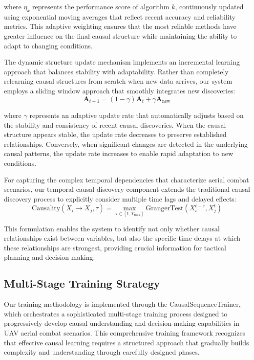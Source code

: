 \documentclass[12pt]{article}
\begin{document}
where $\eta_k$ represents the performance score of algorithm $k$, continuously updated using exponential moving averages that reflect recent accuracy and reliability metrics. This adaptive weighting ensures that the most reliable methods have greater influence on the final causal structure while maintaining the ability to adapt to changing conditions.

The dynamic structure update mechanism implements an incremental learning approach that balances stability with adaptability. Rather than completely relearning causal structures from scratch when new data arrives, our system employs a sliding window approach that smoothly integrates new discoveries:
\begin{equation}
\mathbf{A}_{t+1} = (1-\gamma) \mathbf{A}_t + \gamma \mathbf{A}_{\text{new}}
\end{equation}

where $\gamma$ represents an adaptive update rate that automatically adjusts based on the stability and consistency of recent causal discoveries. When the causal structure appears stable, the update rate decreases to preserve established relationships. Conversely, when significant changes are detected in the underlying causal patterns, the update rate increases to enable rapid adaptation to new conditions.

For capturing the complex temporal dependencies that characterize aerial combat scenarios, our temporal causal discovery component extends the traditional causal discovery process to explicitly consider multiple time lags and delayed effects:
\begin{equation}
\text{Causality}(X_i \rightarrow X_j, \tau) = \max_{\tau \in [1, T_{\max}]} \text{GrangerTest}(X_i^{t-\tau}, X_j^t)
\end{equation}

This formulation enables the system to identify not only whether causal relationships exist between variables, but also the specific time delays at which these relationships are strongest, providing crucial information for tactical planning and decision-making.

\subsection{Multi-Stage Training Strategy}

Our training methodology is implemented through the CausalSequenceTrainer, which orchestrates a sophisticated multi-stage training process designed to progressively develop causal understanding and decision-making capabilities in UAV aerial combat scenarios. This comprehensive training framework recognizes that effective causal learning requires a structured approach that gradually builds complexity and understanding through carefully designed phases.
\end{document}
